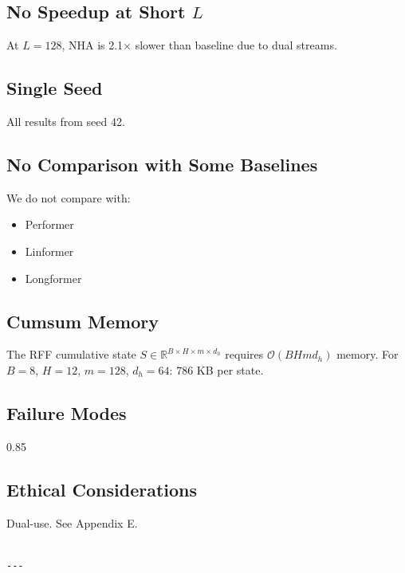 \subsection{No Speedup at Short $L$}

At $L = 128$, NHA is 2.1$\times$ slower than baseline due to dual 
streams.

\subsection{Single Seed}

All results from seed 42.

\subsection{No Comparison with Some Baselines}

We do not compare with:
\begin{itemize}
\item Performer
\item Linformer
\item Longformer

\end{itemize}
\subsection{Cumsum Memory}

The RFF cumulative state $S \in \mathbb{R}^{B \times H \times m \times d_h}$ 
requires $\mathcal{O}(B H m d_h)$ memory. For $B=8$, $H=12$, $m=128$, 
$d_h=64$: 786 KB per state.

\subsection{Failure Modes}

0.85

\subsection{Ethical Considerations}

Dual-use. See Appendix E.
\begin{lstlisting}

---
\end{lstlisting}